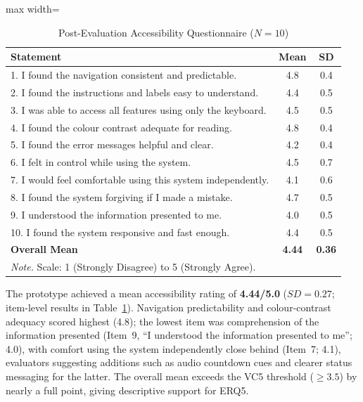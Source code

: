 \documentclass[journal,onecolumn]{IEEEtran}
\begin{document}
\begin{table}[htbp]
\centering
\caption{Post-Evaluation Accessibility Questionnaire ($N=10$)}
\label{tab:a11y-questionnaire}
\small
\begin{adjustbox}{max width=\columnwidth}
\begin{tabular}{|p{5.5cm}|c|c|}
\hline
\textbf{Statement} & \textbf{Mean} & \textbf{SD} \\
\hline
1. I found the navigation consistent and predictable. & 4.8 & 0.4 \\
\hline
2. I found the instructions and labels easy to understand. & 4.4 & 0.5 \\
\hline
3. I was able to access all features using only the keyboard. & 4.5 & 0.5 \\
\hline
4. I found the colour contrast adequate for reading. & 4.8 & 0.4 \\
\hline
5. I found the error messages helpful and clear. & 4.2 & 0.4 \\
\hline
6. I felt in control while using the system. & 4.5 & 0.7 \\
\hline
7. I would feel comfortable using this system independently. & 4.1 & 0.6 \\
\hline
8. I found the system forgiving if I made a mistake. & 4.7 & 0.5 \\
\hline
9. I understood the information presented to me. & 4.0 & 0.5 \\
\hline
10. I found the system responsive and fast enough. & 4.4 & 0.5 \\
\hline
\textbf{Overall Mean} & \textbf{4.44} & \textbf{0.36} \\
\hline
\multicolumn{3}{l}{\footnotesize\textit{Note.} Scale: 1 (Strongly Disagree) to 5 (Strongly Agree).}
\end{tabular}
\end{adjustbox}
\end{table}

The prototype achieved a mean accessibility rating of \textbf{4.44/5.0} ($SD = 0.27$; item-level results in Table~\ref{tab:a11y-questionnaire}). Navigation predictability and colour-contrast adequacy scored highest (4.8); the lowest item was comprehension of the information presented (Item~9, ``I understood the information presented to me''; 4.0), with comfort using the system independently close behind (Item~7; 4.1), evaluators suggesting additions such as audio countdown cues and clearer status messaging for the latter. The overall mean exceeds the VC5 threshold ($\geq 3.5$) by nearly a full point, giving descriptive support for ERQ5.
\end{document}
